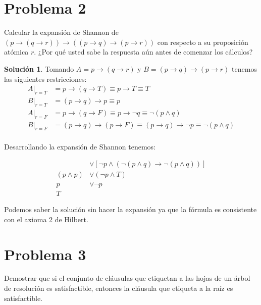 \documentclass[letterpaper,12pt]{memoir}
\theoremstyle{definition}
\newtheorem*{solution}{Solución}
\begin{document}
\section*{Problema 2}

Calcular la expansión de Shannon de \( (p \rightarrow (q \rightarrow r)) \rightarrow ((p \rightarrow q) \rightarrow (p \rightarrow r))  \) con respecto a su proposición atómica \(r\). ¿Por qué usted sabe la respuesta aún antes de comenzar los cálculos?

\begin{solution}
  Tomando \(A = p \rightarrow (q \rightarrow r) \) y \(B = (p \rightarrow q) \rightarrow (p \rightarrow r)\) tenemos las siguientes restricciones:
  \begin{align*}
    A|_{r = T} &= p \rightarrow (q \rightarrow T) \equiv p \rightarrow T \equiv T \\
    B|_{r = T} &= (p \rightarrow q) \rightarrow p \equiv p \\
    A|_{r = F} &= p \rightarrow (q \rightarrow F) \equiv p \rightarrow \neg q \equiv \neg (p \land q) \\
    B|_{r = F} &= (p \rightarrow q) \rightarrow (p \rightarrow F) \equiv (p \rightarrow q) \rightarrow \neg p \equiv \neg (p \land q)\\
  \end{align*}

  Desarrollando la expansión de Shannon tenemos:

  \begin{align*}
    [p \land (T \rightarrow p)] &\lor [\neg p \land (\neg (p \land q) \rightarrow \neg (p \land q))] \\
    (p \land p) &\lor (\neg p \land T) \\
    p &\lor \neg p \\
    T &
  \end{align*} 

  Podemos saber la solución sin hacer la expansión ya que la fórmula es consistente con el axioma 2 de Hilbert.

\end{solution}

\section*{Problema 3}

Demostrar que si el conjunto de cláusulas que etiquetan a las hojas de un árbol de resolución es satisfactible, entonces la cláusula que etiqueta a la raíz es satisfactible.
\end{document}
